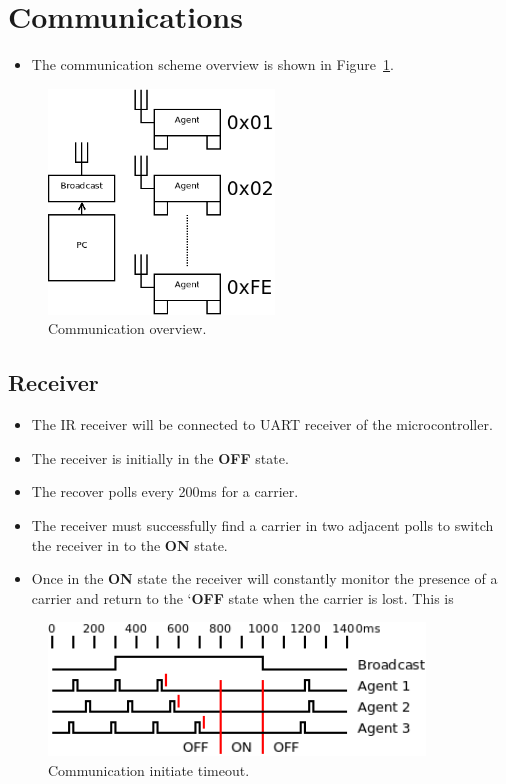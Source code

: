 \documentclass[a4paper]{article}
\begin{document}
\section{Communications}
 
\begin{itemize}
   \item The communication scheme overview is shown in Figure~\ref{fig_communications}. 
\end{itemize}


\begin{figure}[h]
   \centering
   \label{fig_communications}
   \includegraphics[width=6cm,keepaspectratio]{communications/communications.png} 
   \caption{Communication overview.}
\end{figure}
 
   \subsection{Receiver}
      \begin{itemize}
         \item The IR receiver will be connected to UART receiver of the microcontroller. 
         \item The receiver is initially in the \textbf{OFF} state. 
         \item The recover polls every 200ms for a carrier.
         \item The receiver must successfully find a carrier in two adjacent polls to switch the 
               receiver in to the \textbf{ON} state.
         \item Once in the \textbf{ON} state the receiver will constantly monitor the presence 
               of a carrier and return to the `\textbf{OFF} state when the carrier is lost. 
               This is 
      \end{itemize}

      \begin{figure}[h]
         \centering
         \label{fig_communications_time}
         \includegraphics[width=10cm,keepaspectratio]{communications/communications_time.png} 
         \caption{Communication initiate timeout.}
      \end{figure}
\end{document}
